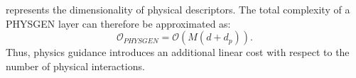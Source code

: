 represents the dimensionality of physical descriptors. The total complexity of a PHYSGEN layer can therefore be approximated as: \begin{equation} \mathcal{O}_{PHYSGEN} = \mathcal{O} ( M(d+d_p) ). \end{equation} Thus, physics guidance introduces an additional linear cost with respect to the number of physical interactions. %